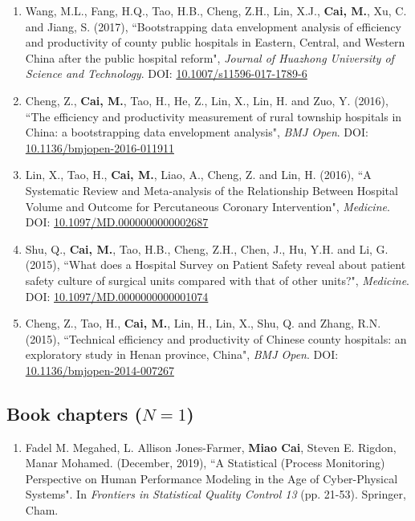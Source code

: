 \documentclass[11pt, a4paper]{article}
\newcommand{\years}[1]{\marginnote{\scriptsize #1}}
\begin{document}
\begin{enumerate}[leftmargin=0ex,itemsep=1ex]
		\item Wang, M.L., Fang, H.Q., Tao, H.B., Cheng, Z.H., Lin, X.J., \textbf{Cai, M.}, Xu, C. and Jiang, S. (2017), ``Bootstrapping data envelopment analysis of efficiency and productivity of county public hospitals in Eastern, Central, and Western China after the public hospital reform", \emph{Journal of Huazhong University of Science and Technology}. DOI: \href{https://doi.org/10.1007/s11596-017-1789-6}{10.1007/s11596-017-1789-6}
		
		
		\item \years{2016}Cheng, Z., \textbf{Cai, M.}, Tao, H., He, Z., Lin, X., Lin, H. and Zuo, Y. (2016), ``The efficiency and productivity measurement of rural township hospitals in China: a bootstrapping data envelopment analysis", \emph{BMJ Open}. DOI: \href{https://doi.org/10.1136/bmjopen-2016-011911}{10.1136/bmjopen-2016-011911}
		
		\item Lin, X., Tao, H., \textbf{Cai, M.}, Liao, A., Cheng, Z. and Lin, H. (2016), ``A Systematic Review and Meta-analysis of the Relationship Between Hospital Volume and Outcome for Percutaneous Coronary Intervention", \emph{Medicine}. DOI: \href{https://doi.org/10.1097/MD.0000000000002687}{10.1097/MD.0000000000002687}
		
		
		\item \years{2015}Shu, Q., \textbf{Cai, M.}, Tao, H.B., Cheng, Z.H., Chen, J., Hu, Y.H. and Li, G. (2015), ``What does a Hospital Survey on Patient Safety reveal about patient safety culture of surgical units compared with that of other units?", \emph{Medicine}. DOI: \href{https://doi.org/10.1097/MD.0000000000001074}{10.1097/MD.0000000000001074}
		
		\item Cheng, Z., Tao, H., \textbf{Cai, M.}, Lin, H., Lin, X., Shu, Q. and Zhang, R.N. (2015), ``Technical efficiency and productivity of Chinese county hospitals: an exploratory study in Henan province, China", \emph{BMJ Open}. DOI: \href{https://doi.org/10.1136/bmjopen-2014-007267}{10.1136/bmjopen-2014-007267}
	\end{enumerate}
	
	
	
	\subsection*{Book chapters ($N=1$)}
	\begin{enumerate}[leftmargin=0ex,itemsep=1ex]
		\item \years{2019}Fadel M. Megahed, L. Allison Jones-Farmer, \textbf{Miao Cai}, Steven E. Rigdon, Manar Mohamed. (December, 2019), ``A Statistical (Process Monitoring) Perspective on Human Performance Modeling in the Age of Cyber-Physical Systems". In \textit{Frontiers in Statistical Quality Control 13} (pp. 21-53). Springer, Cham.
	\end{enumerate}
	
\end{document}
